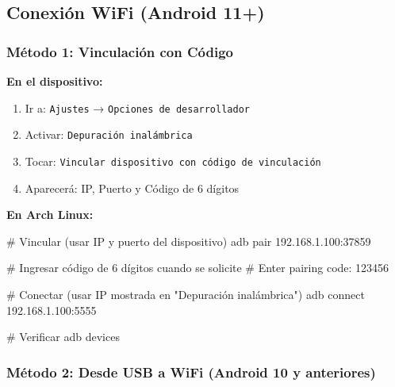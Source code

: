 \documentclass[
  doc,
  floatsintext,
  longtable,
  a4paper,
  nolmodern,
  notxfonts,
  notimes,
  12pt,
  colorlinks=true,linkcolor=blue,citecolor=blue,urlcolor=blue]{apa7}
\newenvironment{Shaded}{\begin{snugshade}}{\end{snugshade}}
\newcommand{\CommentTok}[1]{\textcolor[rgb]{0.37,0.37,0.37}{#1}}
\newcommand{\ExtensionTok}[1]{\textcolor[rgb]{0.00,0.23,0.31}{#1}}
\newcommand{\NormalTok}[1]{\textcolor[rgb]{0.00,0.23,0.31}{#1}}
\providecommand{\tightlist}{%
  \setlength{\itemsep}{0pt}\setlength{\parskip}{0pt}}
\begin{document}
\subsection{Conexión WiFi (Android
11+)}\label{conexiuxf3n-wifi-android-11}

\subsubsection{Método 1: Vinculación con
Código}\label{muxe9todo-1-vinculaciuxf3n-con-cuxf3digo}

\textbf{En el dispositivo:}

\begin{enumerate}
\def\labelenumi{\arabic{enumi}.}
\tightlist
\item
  Ir a: \texttt{Ajustes} → \texttt{Opciones\ de\ desarrollador}
\item
  Activar: \texttt{Depuración\ inalámbrica}
\item
  Tocar: \texttt{Vincular\ dispositivo\ con\ código\ de\ vinculación}
\item
  Aparecerá: IP, Puerto y Código de 6 dígitos
\end{enumerate}

\textbf{En Arch Linux:}

\begin{Shaded}
\begin{Highlighting}[]
\CommentTok{\# Vincular (usar IP y puerto del dispositivo)}
\ExtensionTok{adb}\NormalTok{ pair 192.168.1.100:37859}

\CommentTok{\# Ingresar código de 6 dígitos cuando se solicite}
\CommentTok{\# Enter pairing code: 123456}

\CommentTok{\# Conectar (usar IP mostrada en "Depuración inalámbrica")}
\ExtensionTok{adb}\NormalTok{ connect 192.168.1.100:5555}

\CommentTok{\# Verificar}
\ExtensionTok{adb}\NormalTok{ devices}
\end{Highlighting}
\end{Shaded}

\subsubsection{Método 2: Desde USB a WiFi (Android 10 y
anteriores)}\label{muxe9todo-2-desde-usb-a-wifi-android-10-y-anteriores}
\end{document}
